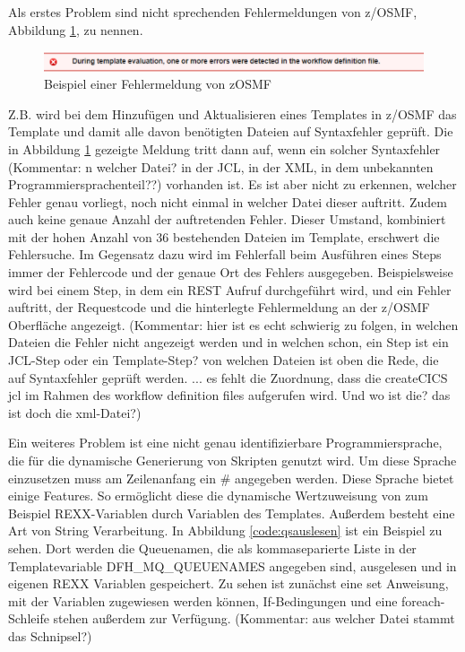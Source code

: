 Als erstes Problem sind nicht sprechenden Fehlermeldungen von z/OSMF, Abbildung \ref{fig:zosmffehler}, zu nennen.
\begin{figure}[h]
	\centering
	\includegraphics[width=\textwidth]{figures/zosmffehlermeldung.png}
	\caption{Beispiel einer Fehlermeldung von zOSMF}
	\label{fig:zosmffehler}
\end{figure}
Z.B. wird bei dem Hinzufügen und Aktualisieren eines Templates in z/OSMF das Template und damit alle davon benötigten Dateien auf Syntaxfehler geprüft.
Die in Abbildung \ref{fig:zosmffehler} gezeigte Meldung tritt dann auf, wenn ein solcher Syntaxfehler (Kommentar: n welcher Datei? in der JCL, in der XML, in dem unbekannten Programmiersprachenteil??) vorhanden ist.
Es ist aber nicht zu erkennen, welcher Fehler genau vorliegt, noch nicht einmal in welcher Datei dieser auftritt.
Zudem auch keine genaue Anzahl der auftretenden Fehler.
Dieser Umstand, kombiniert mit der hohen Anzahl von 36 bestehenden Dateien im Template, erschwert die Fehlersuche.
Im Gegensatz dazu wird im Fehlerfall beim Ausführen eines Steps  immer der Fehlercode und der genaue Ort des Fehlers ausgegeben.
Beispielsweise wird bei einem Step, in dem ein REST Aufruf durchgeführt wird, und ein Fehler auftritt, der Requestcode und die hinterlegte Fehlermeldung an der z/OSMF Oberfläche angezeigt. (Kommentar: hier ist es echt schwierig zu folgen, in welchen Dateien die Fehler nicht angezeigt werden und in welchen schon, ein Step ist ein JCL-Step oder ein Template-Step? von welchen Dateien ist oben die Rede, die auf Syntaxfehler geprüft werden. ... es fehlt die Zuordnung, dass die createCICS jcl im Rahmen des workflow definition files aufgerufen wird. Und wo ist die? das ist doch die xml-Datei?)

Ein weiteres Problem ist eine nicht genau identifizierbare Programmiersprache, die für die dynamische Generierung von Skripten genutzt wird. 
Um diese Sprache einzusetzen muss am Zeilenanfang ein \glqq\#\grqq{} angegeben werden.
Diese Sprache bietet einige Features.
So ermöglicht diese die dynamische Wertzuweisung von zum Beispiel REXX-Variablen durch Variablen des Templates.
Außerdem besteht eine Art von String Verarbeitung.
In Abbildung \ref{code:qsauslesen} ist ein Beispiel zu sehen.
Dort werden die Queuenamen, die als kommaseparierte Liste in der Templatevariable \glqq DFH\_MQ\_QUEUENAMES\grqq{} angegeben sind, ausgelesen und in eigenen REXX Variablen gespeichert.
Zu sehen ist zunächst eine \glqq set\grqq{} Anweisung, mit der Variablen zugewiesen werden können, If-Bedingungen und eine foreach-Schleife stehen außerdem zur Verfügung. (Kommentar: aus welcher Datei stammt das Schnipsel?)

